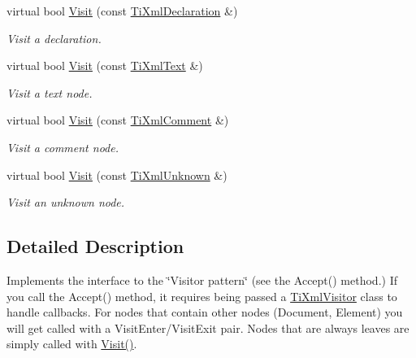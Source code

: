 \begin{DoxyCompactItemize}
virtual bool \hyperlink{classTiXmlVisitor_afad71c71ce6473fb9b4b64cd92de4a19}{Visit} (const \hyperlink{classTiXmlDeclaration}{Ti\+Xml\+Declaration} \&)
\begin{DoxyCompactList}\small\item\em Visit a declaration. \end{DoxyCompactList}\item 
\mbox{\label{classTiXmlVisitor_a399b8ebca5cd14664974a32d2ce029e5}} 
virtual bool \hyperlink{classTiXmlVisitor_a399b8ebca5cd14664974a32d2ce029e5}{Visit} (const \hyperlink{classTiXmlText}{Ti\+Xml\+Text} \&)
\begin{DoxyCompactList}\small\item\em Visit a text node. \end{DoxyCompactList}\item 
\mbox{\label{classTiXmlVisitor_a53a60e7a528627b31af3161972cc7fa2}} 
virtual bool \hyperlink{classTiXmlVisitor_a53a60e7a528627b31af3161972cc7fa2}{Visit} (const \hyperlink{classTiXmlComment}{Ti\+Xml\+Comment} \&)
\begin{DoxyCompactList}\small\item\em Visit a comment node. \end{DoxyCompactList}\item 
\mbox{\label{classTiXmlVisitor_a7e284d607d275c51dac1adb58159ce28}} 
virtual bool \hyperlink{classTiXmlVisitor_a7e284d607d275c51dac1adb58159ce28}{Visit} (const \hyperlink{classTiXmlUnknown}{Ti\+Xml\+Unknown} \&)
\begin{DoxyCompactList}\small\item\em Visit an unknown node. \end{DoxyCompactList}\end{DoxyCompactItemize}


\subsection{Detailed Description}
Implements the interface to the \char`\"{}\+Visitor pattern\char`\"{} (see the Accept() method.) If you call the Accept() method, it requires being passed a \hyperlink{classTiXmlVisitor}{Ti\+Xml\+Visitor} class to handle callbacks. For nodes that contain other nodes (Document, Element) you will get called with a Visit\+Enter/\+Visit\+Exit pair. Nodes that are always leaves are simply called with \hyperlink{classTiXmlVisitor_afad71c71ce6473fb9b4b64cd92de4a19}{Visit()}.

